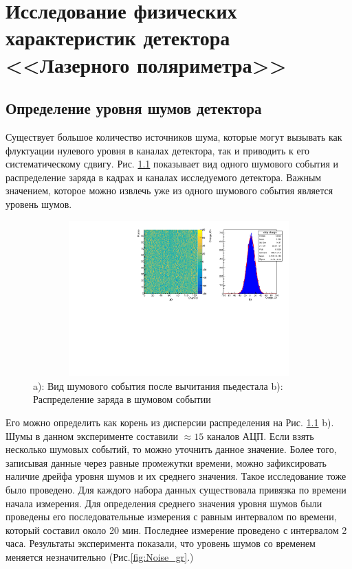 \vspace{24pt}
\chapter{Исследование физических характеристик детектора <<Лазерного поляриметра>>}
\section{Определение уровня шумов детектора}
\label{sec:noise_study}
Существует большое количество источников шума, которые могут вызывать как флуктуации нулевого уровня в каналах детектора, так и приводить к его систематическому сдвигу. Рис. \ref{noise_map} показывает вид одного шумового события и распределение заряда в кадрах и каналах исследуемого детектора. Важным значением, которое можно извлечь уже из одного шумового события является уровень шумов. 
\begin{figure}[H]
	\begin{center}
		\includegraphics[width = 12cm, height = 6cm]{img/noise_map.pdf}
		\caption{a): Вид шумового события после вычитания пьедестала b): Распределение заряда в шумовом событии}
		\label{noise_map}
	\end{center}
\end{figure}
\vspace{-20pt}
\noindent Его можно определить как корень из дисперсии распределения на Рис. \ref{noise_map} b). Шумы в данном эксперименте составили $\approx15$ каналов АЦП. Если взять несколько шумовых событий, то можно уточнить данное значение. Более того, записывая данные через равные промежутки времени, можно зафиксировать наличие дрейфа уровня шумов и их среднего значения. Такое исследование тоже было проведено. Для каждого набора данных существовала привязка по времени начала измерения. Для определения среднего значения уровня шумов были проведены его последовательные измерения с равным интервалом по времени, который составил около 20 мин. Последнее измерение проведено с интервалом 2 часа. Результаты эксперимента показали, что уровень шумов со временем меняется незначительно (Рис.\ref{fig:Noise_gr}.)

